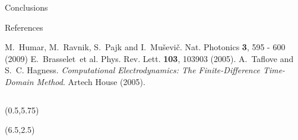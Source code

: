 \documentclass[8pt]{beamer}
\newcommand{\blockpadding}{
  \rule[-0.6ex]{0pt}{2.5ex}
}
\begin{document}
\begin{columns}[t]
\begin{column}{0.596\textwidth}
\begin{block}{\blockpadding Conclusions}
\end{block}


 \begin{block}{\blockpadding References}
  \begin{thebibliography}{6}
M.~Humar, M.~Ravnik, S.~Pajk and I.~Mu\v sevi\v c. Nat. Photonics {\bf 3}, 595 - 600 (2009) 
E.~Brasselet~et al. Phys. Rev. Lett. {\bf 103}, 103903 (2005).
A.~Taflove and S.~C. Hagness. {\em Computational Electrodynamics: The Finite-Difference Time-Domain Method}. Artech House (2005).
\end{thebibliography}

 \end{block}

 \end{column}

\end{columns}

\begin{textblock}{5.5}(0.5,5.75)
 

\end{textblock}

\begin{textblock}{8.5}(6.5,2.5)

\end{textblock}
\end{document}
